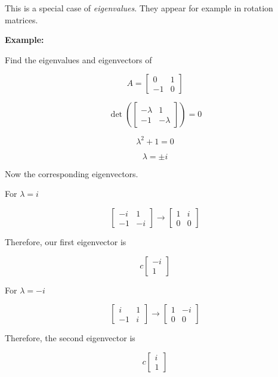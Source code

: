 This is a special case of \emph{eigenvalues}. They appear for example in rotation matrices.

\textbf{Example:}

Find the eigenvalues and eigenvectors of

\[
    A = \begin{bmatrix}
        0 & 1 \\
        -1 & 0 
    \end{bmatrix}
\]

\[
    \det\left( 
    \begin{bmatrix}
        -\lambda & 1 \\
        -1 & -\lambda
    \end{bmatrix}
    \right) = 0
\]

\[
    \lambda^2 + 1 = 0 
\]

\[
    \lambda = \pm i
\]

Now the corresponding eigenvectors.

For \(\lambda = i\)

\[     
    \begin{bmatrix}
        -i & 1 \\
        -1 & -i
    \end{bmatrix}
    \rightarrow
    \begin{bmatrix}
        1 & i \\
        0 & 0
    \end{bmatrix} 
\]

Therefore, our first eigenvector is 

\[  
    c
    \begin{bmatrix}
        -i \\
        1        
    \end{bmatrix}
\]

For \(\lambda = -i\)

\[     
    \begin{bmatrix}
        i & 1 \\
        -1 & i
    \end{bmatrix}
    \rightarrow
    \begin{bmatrix}
        1 & -i \\
        0 & 0
    \end{bmatrix} 
\]

Therefore, the second eigenvector is 

\[  
    c
    \begin{bmatrix}
        i \\
        1        
    \end{bmatrix}
\]

